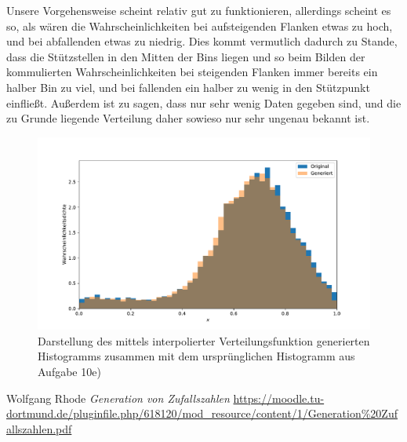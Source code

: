 \documentclass[a4paper, 11pt]{article}
\begin{document}
Unsere Vorgehensweise scheint relativ gut zu funktionieren, allerdings scheint es so, als wären die Wahrscheinlichkeiten bei aufsteigenden Flanken etwas zu hoch, und bei abfallenden etwas zu niedrig. Dies kommt vermutlich dadurch zu Stande, dass die Stützstellen in den Mitten der Bins liegen und so beim Bilden der kommulierten Wahrscheinlichkeiten bei steigenden Flanken immer bereits ein halber Bin zu viel, und bei fallenden ein halber zu wenig in den Stützpunkt einfließt. Außerdem ist zu sagen, dass nur sehr wenig Daten gegeben sind, und die zu Grunde liegende Verteilung daher sowieso nur sehr ungenau bekannt ist.
\begin{figure}
    \centering
    \includegraphics[width=\textwidth]{../A10/A10e.pdf}
    \caption{Darstellung des mittels interpolierter Verteilungsfunktion generierten Histogramms zusammen mit dem ursprünglichen Histogramm aus Aufgabe 10e)}
    \label{fig:a10e}
\end{figure}
\FloatBarrier


\begin{thebibliography}{9}
    Wolfgang Rhode
    \textit{Generation von Zufallszahlen}
    \url{https://moodle.tu-dortmund.de/pluginfile.php/618120/mod_resource/content/1/Generation\%20Zufallszahlen.pdf}
\end{thebibliography}
\end{document}
